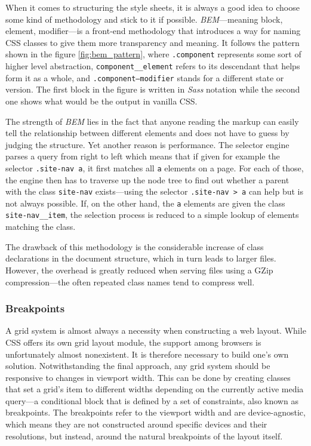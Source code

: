 \documentclass[thesis=M,english,hidelinks]{FITthesis}[2012/10/20]
\newcommand{\code}{\texttt}
\begin{document}
When it comes to structuring the style sheets, it is always a good idea to choose some kind of methodology and stick to it if possible. \textit{BEM}---meaning block, element, modifier---is a front-end methodology that introduces a way for naming CSS classes to give them more transparency and meaning. It follows the pattern shown in the figure \ref{fig:bem_pattern}, where \code{.component} represents some sort of higher level abstraction, \code{component\_\_element} refers to its descendant that helps form it as a whole, and \code{.component--modifier} stands for a different state or version. The first block in the figure is written in \textit{Sass} notation while the second one shows what would be the output in vanilla CSS.

The strength of \textit{BEM} lies in the fact that anyone reading the markup can easily tell the relationship between different elements and does not have to guess by judging the structure. Yet another reason is performance. The selector engine parses a query from right to left which means that if given for example the selector \code{.site-nav a}, it first matches all \code{a} elements on a page. For each of those, the engine then has to traverse up the node tree to find out whether a parent with the class \code{site-nav} exists---using the selector \code{.site-nav > a} can help but is not always possible. If, on the other hand, the \code{a} elements are given the class \code{site-nav\_\_item}, the selection process is reduced to a simple lookup of elements matching the class.

The drawback of this methodology is the considerable increase of class declarations in the document structure, which in turn leads to larger files. However, the overhead is greatly reduced when serving files using a GZip compression---the often repeated class names tend to compress well.

    \subsubsection{Breakpoints}

A grid system is almost always a necessity when constructing a web layout. While CSS offers its own grid layout module, the support among browsers is unfortunately almost nonexistent. It is therefore necessary to build one's own solution. Notwithstanding the final approach, any grid system should be responsive to changes in viewport width. This can be done by creating classes that set a grid's item to different widths depending on the currently active media query---a conditional block that is defined by a set of constraints, also known as breakpoints. The breakpoints refer to the viewport width and are device-agnostic, which means they are not constructed around specific devices and their resolutions, but instead, around the natural breakpoints of the layout itself.
\end{document}
